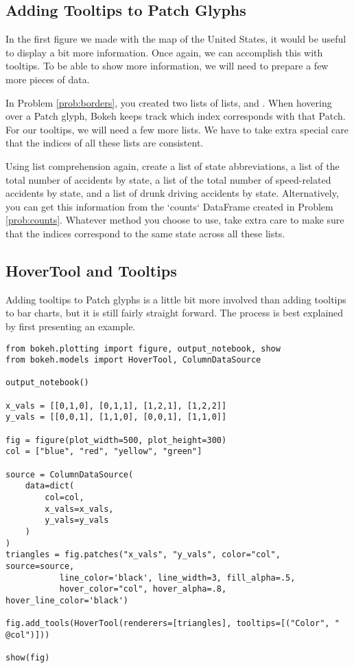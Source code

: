 \subsection*{Adding Tooltips to Patch Glyphs}
In the first figure we made with the map of the United States, it would be useful
to display a bit more information. Once again, we can accomplish this with
tooltips. To be able to show more information, we will need to prepare a few more
pieces of data.

\begin{problem}
In Problem \ref{prob:borders}, you created two lists of lists,  and
. When hovering over a Patch glyph, Bokeh keeps track which index
corresponds with that Patch. For our tooltips, we will need a few more lists. We
have to take extra special care that the indices of all these lists are
consistent.

Using list comprehension again, create a list of state abbreviations, a list of
the total number of accidents by state, a list of the total number of speed-related
accidents by state, and a list of drunk driving accidents by state. Alternatively,
you can get this information from the `counts` DataFrame created in Problem
\ref{prob:counts}. Whatever method you choose to use, take extra care to make
sure that the indices correspond to the same state across all these lists.
\end{problem}

\subsection*{HoverTool and Tooltips}
Adding tooltips to Patch glyphs is a little bit more involved than adding tooltips
to bar charts, but it is still fairly straight forward. The process is best
explained by first presenting an example.

\begin{lstlisting}
from bokeh.plotting import figure, output_notebook, show
from bokeh.models import HoverTool, ColumnDataSource

output_notebook()

x_vals = [[0,1,0], [0,1,1], [1,2,1], [1,2,2]]
y_vals = [[0,0,1], [1,1,0], [0,0,1], [1,1,0]]

fig = figure(plot_width=500, plot_height=300)
col = ["blue", "red", "yellow", "green"]

source = ColumnDataSource(
    data=dict(
        col=col,
        x_vals=x_vals,
        y_vals=y_vals
    )
)
triangles = fig.patches("x_vals", "y_vals", color="col", source=source,
           line_color='black', line_width=3, fill_alpha=.5,
           hover_color="col", hover_alpha=.8, hover_line_color='black')

fig.add_tools(HoverTool(renderers=[triangles], tooltips=[("Color", " @col")]))

show(fig)
\end{lstlisting}
